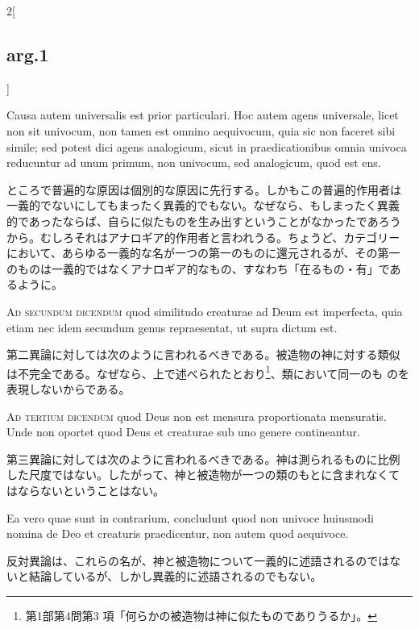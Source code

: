 \documentclass[paper=a4paper,fontsize=10pt,jafontsize=9pt,titlepage]{jlreq}
\begin{document}
\begin{paracol}{2}[\subsection{arg.1}]
\switchcolumn*

Causa autem universalis est prior particulari. Hoc autem agens
universale, licet non sit univocum, non tamen est omnino aequivocum,
quia sic non faceret sibi simile; sed potest dici agens analogicum,
sicut in praedicationibus omnia univoca reducuntur ad unum primum, non
univocum, sed analogicum, quod est ens.

\switchcolumn

ところで普遍的な原因は個別的な原因に先行する。しかもこの普遍的作用者は
一義的でないにしてもまったく異義的でもない。なぜなら、もしまったく異義
的であったならば、自らに似たものを生み出すということがなかったであろう
から。むしろそれはアナロギア的作用者と言われうる。ちょうど、カテゴリー
において、あらゆる一義的な名が一つの第一のものに還元されるが、その第一
のものは一義的ではなくアナロギア的なもの、すなわち「在るもの・有」であ
るように。

\switchcolumn*[\subsection{ad.2}]

{\scshape Ad secundum dicendum} quod similitudo creaturae ad Deum est
imperfecta, quia etiam nec idem secundum genus repraesentat, ut supra
dictum est.

\switchcolumn

第二異論に対しては次のように言われるべきである。被造物の神に対する類似
は不完全である。なぜなら、上で述べられたとおり\footnote{第1部第4問第3
項「何らかの被造物は神に似たものでありうるか」。}、類において同一のも
のを表現しないからである。

\switchcolumn*[\subsection{ad.3}]

{\scshape Ad tertium dicendum} quod Deus non est mensura proportionata
mensuratis. Unde non oportet quod Deus et creaturae sub uno genere
contineantur.

\switchcolumn

第三異論に対しては次のように言われるべきである。神は測られるものに比例
した尺度ではない。したがって、神と被造物が一つの類のもとに含まれなくて
はならないということはない。

\switchcolumn*

Ea vero quae sunt in contrarium, concludunt quod non univoce huiusmodi
nomina de Deo et creaturis praedicentur, non autem quod aequivoce.

\switchcolumn

反対異論は、これらの名が、神と被造物について一義的に述語されるのではな
いと結論しているが、しかし異義的に述語されるのでもない。

\end{paracol}
\end{document}
